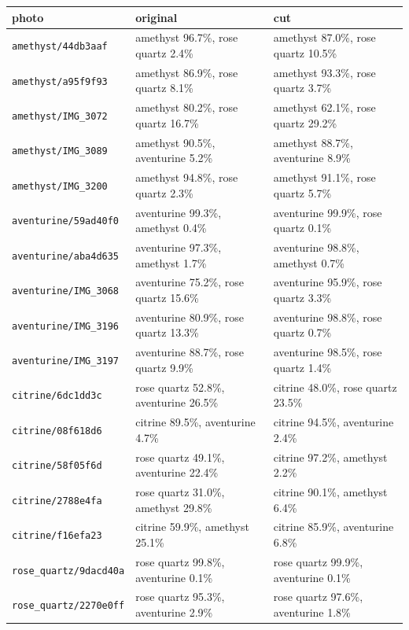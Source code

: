 \documentclass[11pt]{article}
\begin{document}
\begin{center}\scriptsize
\begin{tabular}{lll}
\toprule
photo & original & cut \\
\midrule
\texttt{amethyst/44db3aaf} & amethyst 96.7\%, rose quartz 2.4\% & amethyst 87.0\%, rose quartz 10.5\% \\
\texttt{amethyst/a95f9f93} & amethyst 86.9\%, rose quartz 8.1\% & amethyst 93.3\%, rose quartz 3.7\% \\
\texttt{amethyst/IMG\_3072} & amethyst 80.2\%, rose quartz 16.7\% & amethyst 62.1\%, rose quartz 29.2\% \\
\texttt{amethyst/IMG\_3089} & amethyst 90.5\%, aventurine 5.2\% & amethyst 88.7\%, aventurine 8.9\% \\
\texttt{amethyst/IMG\_3200} & amethyst 94.8\%, rose quartz 2.3\% & amethyst 91.1\%, rose quartz 5.7\% \\
\texttt{aventurine/59ad40f0} & aventurine 99.3\%, amethyst 0.4\% & aventurine 99.9\%, rose quartz 0.1\% \\
\texttt{aventurine/aba4d635} & aventurine 97.3\%, amethyst 1.7\% & aventurine 98.8\%, amethyst 0.7\% \\
\texttt{aventurine/IMG\_3068} & aventurine 75.2\%, rose quartz 15.6\% & aventurine 95.9\%, rose quartz 3.3\% \\
\texttt{aventurine/IMG\_3196} & aventurine 80.9\%, rose quartz 13.3\% & aventurine 98.8\%, rose quartz 0.7\% \\
\texttt{aventurine/IMG\_3197} & aventurine 88.7\%, rose quartz 9.9\% & aventurine 98.5\%, rose quartz 1.4\% \\
\texttt{citrine/6dc1dd3c} & rose quartz 52.8\%, aventurine 26.5\% & citrine 48.0\%, rose quartz 23.5\% \\
\texttt{citrine/08f618d6} & citrine 89.5\%, aventurine 4.7\% & citrine 94.5\%, aventurine 2.4\% \\
\texttt{citrine/58f05f6d} & rose quartz 49.1\%, aventurine 22.4\% & citrine 97.2\%, amethyst 2.2\% \\
\texttt{citrine/2788e4fa} & rose quartz 31.0\%, amethyst 29.8\% & citrine 90.1\%, amethyst 6.4\% \\
\texttt{citrine/f16efa23} & citrine 59.9\%, amethyst 25.1\% & citrine 85.9\%, aventurine 6.8\% \\
\texttt{rose\_quartz/9dacd40a} & rose quartz 99.8\%, aventurine 0.1\% & rose quartz 99.9\%, aventurine 0.1\% \\
\texttt{rose\_quartz/2270e0ff} & rose quartz 95.3\%, aventurine 2.9\% & rose quartz 97.6\%, aventurine 1.8\% \\

\end{tabular}
\end{center}
\end{document}
